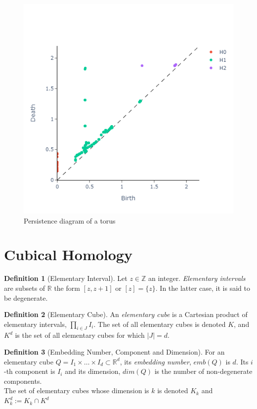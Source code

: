\documentclass{article}
\newcommand{\R}{\mathbb{R}}
\newcommand{\Z}{\mathbb{Z}}
\theoremstyle{plain}
\theoremstyle{definition}
\newtheorem{definition}{Definition}[section]
\theoremstyle{remark}
\begin{document}
\begin{figure}[ht]
    \centering
    \includegraphics[scale=.5]{torus-rips-persistence.png}
    \caption{Persistence diagram of a torus}
    \label{fig:torus-rips-persisntence}
\end{figure}

\section{Cubical Homology}

\begin{definition}[Elementary Interval]
Let $z \in \Z$ an integer. \emph{Elementary intervals} are subsets of $\R$ the form $ [z,z+1] $ or $ [z]= \{z\} $. In the latter case, it is said to be degenerate.  
\end{definition}

\begin{definition}[Elementary Cube]
An \emph{elementary cube} is a Cartesian product of elementary intervals, $ \prod_{i\in J} I_i $. The set of all elementary cubes is denoted $K$, and $K^d$ is the set of all elementary cubes for which $|J| = d$.
\end{definition}

\begin{definition}[Embedding Number, Component and Dimension]
For an elementary cube $Q= I_1 \times \dots \times I_d \subset \R^d$, its \emph{embedding number}, $emb(Q)$ is $d$. Its $i$-th component is $I_i$ and its dimension, $dim(Q)$ is the number of non-degenerate components. \\
The set of elementary cubes whose dimension is $k$ is denoted $K_k$ and $K_k^d := K_k \cap K^d$
\end{definition}
\end{document}
